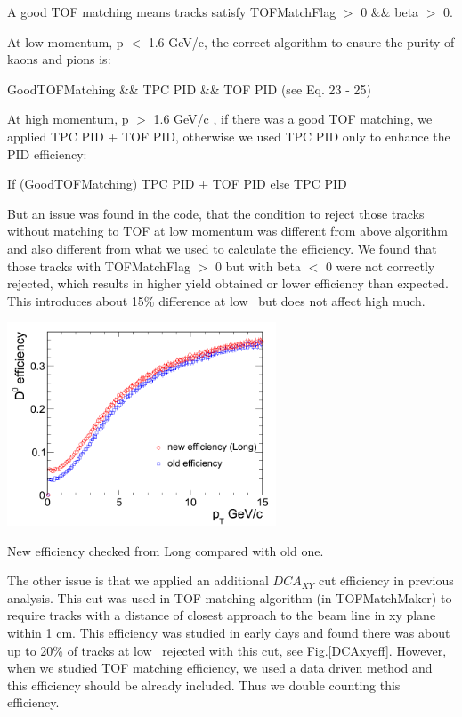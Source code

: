 A good TOF matching means tracks satisfy TOFMatchFlag $>$ 0 \&\& beta $>$ 0.

At low momentum, p $<$ 1.6 GeV/c, the correct algorithm to ensure the purity of kaons and pions is:

GoodTOFMatching \&\& TPC PID \&\& TOF PID (see Eq. 23 - 25)

At high momentum, p $>$ 1.6 GeV/c , if there was a good TOF matching, we applied TPC PID + TOF PID, otherwise we used TPC PID only  to enhance the PID efficiency:

If (GoodTOFMatching) TPC PID + TOF PID
else TPC PID

But an issue was found in the code, that the condition to reject those tracks without matching to TOF at low momentum was different from above algorithm and also different from what we used to calculate the efficiency. We found that those tracks with TOFMatchFlag $>$ 0 but with beta $<$ 0 were not correctly rejected, which results in higher yield obtained or lower efficiency than expected. This introduces about 15\% difference at low \pt\ but does not affect high \pt much.

\bfg \centering
\includegraphics[width=0.6\textwidth]{figure/Run11_YF/eff.png}
\caption{New efficiency checked from Long compared with old one.}
\label{effnew}
\efg

The other issue is that we applied an additional $DCA_{XY}$ cut efficiency in previous analysis. This cut was used in TOF matching algorithm (in TOFMatchMaker) to require tracks with a distance of closest approach to the beam line in xy plane within 1 cm. This efficiency was studied in early days and found there was about up to 20\% of tracks at low \pt\ rejected with this cut, see Fig.\ref{DCAxyeff}. However, when we studied TOF matching efficiency, we used a data driven method and this efficiency should be already included. Thus we double counting this efficiency.

